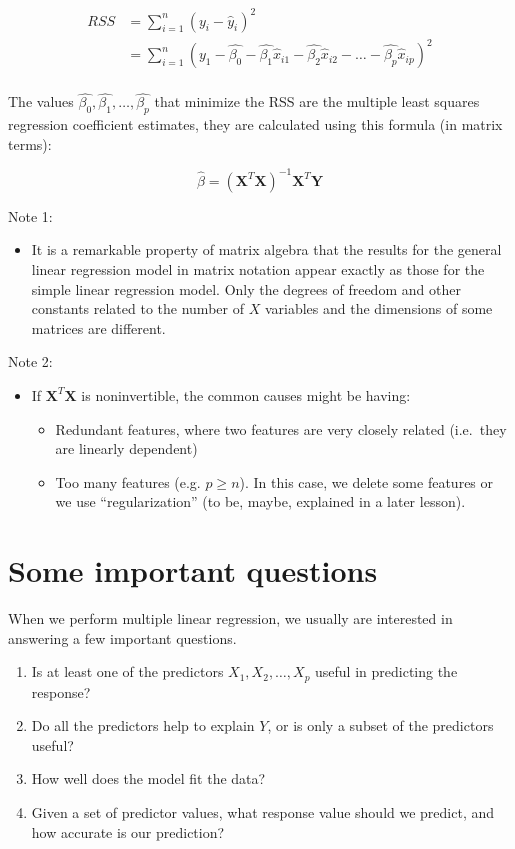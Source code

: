 \documentclass[]{book}
\providecommand{\tightlist}{%
  \setlength{\itemsep}{0pt}\setlength{\parskip}{0pt}}
\newenvironment{rmdblock}[1]
  {\begin{shaded*}
  \begin{itemize}
  \renewcommand{\labelitemi}{
    \raisebox{-.7\height}[0pt][0pt]{
      {\setkeys{Gin}{width=2em,keepaspectratio}\texttt{[image: img/icons/\#1]}}
    }
  }
  \item
  }
  {
  \end{itemize}
  \end{shaded*}
  }
\newenvironment{rmdinsight}
  {\begin{rmdblock}{insight}}
  {\end{rmdblock}}
\begin{document}
\[ \begin{aligned}
RSS &= \sum_{i=1}^{n} (y_i - \hat{y}_i)^2 \\
    &= \sum_{i=1}^{n} (y_1 - \hat{\beta_0} - \hat{\beta_1} \hat{x}_{i1}  - \hat{\beta_2} \hat{x}_{i2} - \ldots  -  \hat{\beta_p} \hat{x}_{ip})^2 \\
\end{aligned}
\]

The values \(\hat{\beta_{0}}, \hat{\beta_{1}}, \ldots, \hat{\beta_{p}}\)
that minimize the RSS are the multiple least squares regression
coefficient estimates, they are calculated using this formula (in matrix
terms):

\[ \hat{\beta} = (\textbf{X}^T \textbf{X})^{-1}\textbf{X}^T \textbf{Y} \]

Note 1:

\begin{rmdinsight}
It is a remarkable property of matrix algebra that the results for the
general linear regression model in matrix notation appear exactly as
those for the simple linear regression model. Only the degrees of
freedom and other constants related to the number of \(X\) variables and
the dimensions of some matrices are different.
\end{rmdinsight}

Note 2:

\begin{rmdinsight}
If \(\textbf{X}^T \textbf{X}\) is noninvertible, the common causes might
be having:

\begin{itemize}
\tightlist
\item
  Redundant features, where two features are very closely related
  (i.e.~they are linearly dependent)
\item
  Too many features (e.g. \(p \geq n\)). In this case, we delete some
  features or we use ``regularization'' (to be, maybe, explained in a
  later lesson).
\end{itemize}
\end{rmdinsight}

\section{Some important questions}\label{some-important-questions}

When we perform multiple linear regression, we usually are interested in
answering a few important questions.

\begin{enumerate}
\def\labelenumi{\arabic{enumi}.}
\tightlist
\item
  Is at least one of the predictors \(X_1 ,X_2 ,\ldots,X_p\) useful in
  predicting the response?
\item
  Do all the predictors help to explain \(Y\), or is only a subset of
  the predictors useful?
\item
  How well does the model fit the data?
\item
  Given a set of predictor values, what response value should we
  predict, and how accurate is our prediction?
\end{enumerate}
\end{document}
